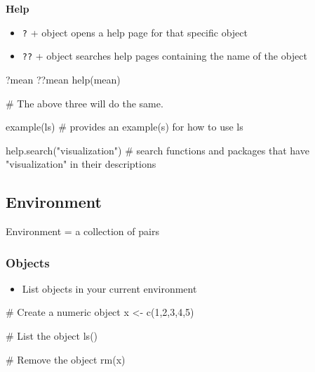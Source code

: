 \documentclass[
  letterpaper,
  DIV=11,
  numbers=noendperiod]{scrreprt}
\newenvironment{Shaded}{\begin{snugshade}}{\end{snugshade}}
\newcommand{\CommentTok}[1]{\textcolor[rgb]{0.37,0.37,0.37}{#1}}
\newcommand{\DecValTok}[1]{\textcolor[rgb]{0.68,0.00,0.00}{#1}}
\newcommand{\FunctionTok}[1]{\textcolor[rgb]{0.28,0.35,0.67}{#1}}
\newcommand{\NormalTok}[1]{\textcolor[rgb]{0.00,0.23,0.31}{#1}}
\newcommand{\OtherTok}[1]{\textcolor[rgb]{0.00,0.23,0.31}{#1}}
\newcommand{\StringTok}[1]{\textcolor[rgb]{0.13,0.47,0.30}{#1}}
\providecommand{\tightlist}{%
  \setlength{\itemsep}{0pt}\setlength{\parskip}{0pt}}\usepackage{longtable,booktabs,array}
\begin{document}
\textbf{Help}

\begin{itemize}
\tightlist
\item
  \texttt{?} + object opens a help page for that specific object
\item
  \texttt{??} + object searches help pages containing the name of the
  object
\end{itemize}

\begin{Shaded}
\begin{Highlighting}[]
\NormalTok{?mean}
\NormalTok{??mean}
\FunctionTok{help}\NormalTok{(mean)}

\CommentTok{\# The above three will do the same. }

\FunctionTok{example}\NormalTok{(ls) }\CommentTok{\# provides an example(s) for how to use ls }

\FunctionTok{help.search}\NormalTok{(}\StringTok{"visualization"}\NormalTok{) }\CommentTok{\# search functions and packages that have "visualization" in their descriptions}
\end{Highlighting}
\end{Shaded}

\hypertarget{environment}{%
\subsection*{Environment}\label{environment}}

Environment = a collection of pairs

\hypertarget{objects}{%
\subsubsection*{Objects}\label{objects}}

\begin{itemize}
\tightlist
\item
  List objects in your current environment
\end{itemize}

\begin{Shaded}
\begin{Highlighting}[]
\CommentTok{\# Create a numeric object }
\NormalTok{x }\OtherTok{\textless{}{-}} \FunctionTok{c}\NormalTok{(}\DecValTok{1}\NormalTok{,}\DecValTok{2}\NormalTok{,}\DecValTok{3}\NormalTok{,}\DecValTok{4}\NormalTok{,}\DecValTok{5}\NormalTok{)}

\CommentTok{\# List the object }
\FunctionTok{ls}\NormalTok{()}

\CommentTok{\# Remove the object }
\FunctionTok{rm}\NormalTok{(x)}
\end{Highlighting}
\end{Shaded}
\end{document}

